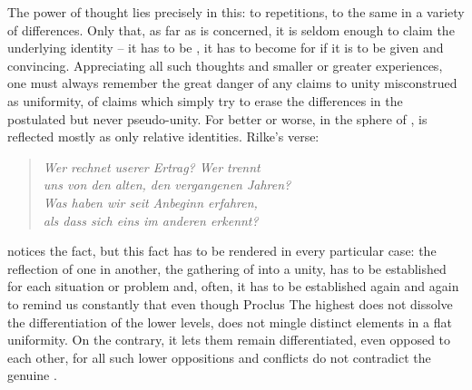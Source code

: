 The power of thought lies precisely in this: to  {repetitions},
to  the same in a variety of differences.  Only that, as far as
 is concerned, it is seldom enough to claim the underlying
identity -- it has to be , it has to become
 for  if it is to be  given and
convincing.  Appreciating all such thoughts and smaller or greater experiences,
one must always remember the great danger of any claims to unity misconstrued as
uniformity, of claims which simply try to erase the differences in the
postulated but never  pseudo-unity.  For better or worse, in the
sphere of ,  is reflected mostly as only
relative identities.  Rilke's verse:
%
\begin{verse}
{\small{\em Wer rechnet userer Ertrag? Wer trennt\\
uns von den alten, den vergangenen Jahren?\\
Was haben wir seit Anbeginn erfahren, \\
als dass sich eins im anderen erkennt?~
}}\end{verse}
%
notices the fact, but this fact has to be rendered  in
every particular case: the reflection of one in another, the gathering
of  into a unity, has to be established for
each situation or problem and, often, it has to be established again
and again to remind us constantly that  even though \citet{they are
  different from each other to the degree, in which they are many.}{Proclus}{}
The highest  does not dissolve the differentiation of the lower
levels, does not mingle distinct elements in a flat uniformity. On the contrary,
it lets them remain differentiated, even opposed to 
each other, for all such lower oppositions and conflicts do not contradict the
genuine . 


